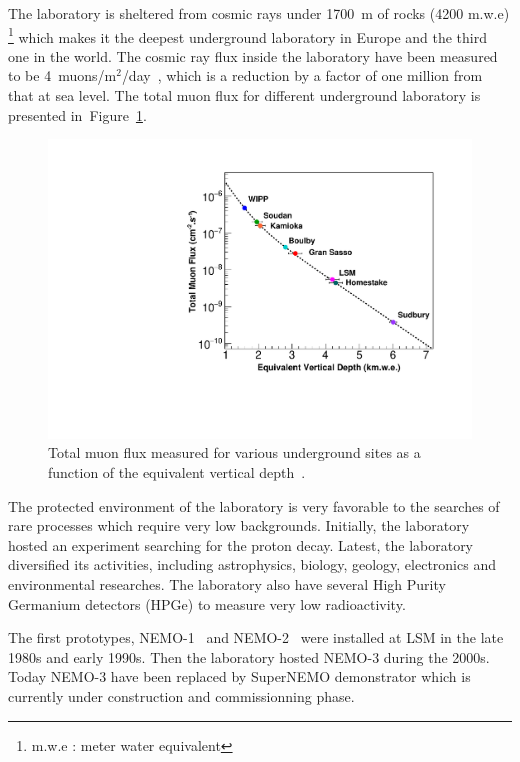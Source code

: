\documentclass[main.tex]{subfiles}
\begin{document}
\NI The laboratory is sheltered from cosmic rays under 1700~m of rocks (4200 m.w.e)  \footnote{m.w.e : meter water equivalent} which makes it the deepest underground laboratory in Europe and the third one in the world. The cosmic ray flux inside the laboratory have been measured to be 4~muons/m$^\text{2}$/day~\cite{CosmicFluxLSM}, which is a reduction by a factor of one million from that at sea level. The total muon flux for different underground laboratory is presented in~Figure~\ref{LabDeepth}.
 

\begin{figure}[h!]
\begin{center}
\includegraphics[scale=0.60]{pictures/Chap3/MuonFluxDifferentLab.pdf}
\caption{Total muon flux measured for various underground sites as a function of the equivalent vertical depth~\cite{MuonFluxUndergroundLab}. }
\label{LabDeepth}
\end{center}
\end{figure}


\NI The protected environment of the laboratory is very favorable to the searches of rare processes which require very low backgrounds. Initially, the laboratory hosted an experiment searching for the proton decay. Latest, the laboratory diversified its activities, including astrophysics, biology, geology, electronics and environmental researches. The laboratory also have several High Purity Germanium detectors (HPGe) to measure very low radioactivity. 


\bigskip


\NI The first prototypes, NEMO-1~\cite{NEMO1} and NEMO-2~\cite{NEMO2} were installed at LSM in the late 1980s and early 1990s. Then the laboratory hosted NEMO-3 during the 2000s. Today NEMO-3 have been replaced by SuperNEMO demonstrator which is currently under construction and commissionning phase.
\end{document}
